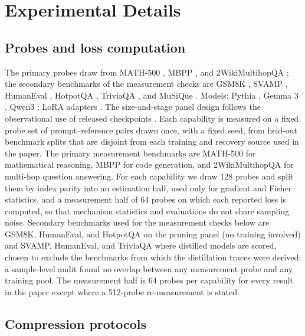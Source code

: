 \section{Experimental Details}
\label{sec:app_details}
\subsection{Probes and loss computation}
\label{sec:app_probes}

The primary probes draw from MATH-500 \citep{hendrycks2021math,lightman2023verify}, MBPP
\citep{austin2021program}, and 2WikiMultihopQA \citep{ho2020constructing}; the secondary benchmarks of the measurement
checks are GSM8K \citep{cobbe2021gsm8k}, SVAMP \citep{patel2021svamp}, HumanEval \citep{chen2021codex}, HotpotQA
\citep{yang2018hotpotqa}, TriviaQA \citep{joshi2017triviaqa}, and MuSiQue \citep{trivedi2022musique}. Models: Pythia
\citep{biderman2023pythia}, Gemma 3 \citep{gemma2025gemma3}, Qwen3 \citep{qwen2025qwen3}; LoRA adapters \citep{hu2022lora}.
The size-and-stage panel design follows the observational use of released checkpoints \citep{ruan2024observational,polo2024tinybenchmarks}.
Each capability is measured on a fixed probe set of prompt--reference
pairs drawn once, with a fixed seed, from held-out benchmark splits that
are disjoint from each training and recovery source used in the paper.
The primary measurement benchmarks are MATH-500 for mathematical
reasoning, MBPP for code generation, and 2WikiMultihopQA for multi-hop
question answering. For each capability we draw 128 probes and split
them by index parity into an estimation half, used only for gradient
and Fisher statistics, and a measurement half of 64 probes on which
each reported loss is computed, so that mechanism statistics and
evaluations do not share sampling noise. Secondary benchmarks used for the measurement checks below are
GSM8K, HumanEval, and HotpotQA on the pruning panel (no training
involved) and SVAMP, HumanEval, and TriviaQA where distilled models are
scored, chosen to exclude the benchmarks from which the distillation
traces were derived; a sample-level audit found no overlap between any
measurement probe and any training pool. The measurement half is 64
probes per capability for every result in the paper except where a
512-probe re-measurement is stated.


\subsection{Compression protocols}
\label{sec:app_compress}
